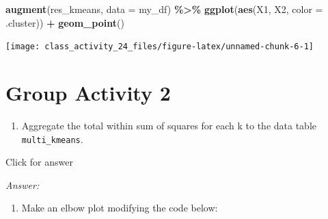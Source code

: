 \documentclass[
]{book}
\newenvironment{Shaded}{\begin{snugshade}}{\end{snugshade}}
\newcommand{\AttributeTok}[1]{\textcolor[rgb]{0.13,0.29,0.53}{#1}}
\newcommand{\DecValTok}[1]{\textcolor[rgb]{0.00,0.00,0.81}{#1}}
\newcommand{\FunctionTok}[1]{\textcolor[rgb]{0.13,0.29,0.53}{\textbf{#1}}}
\newcommand{\NormalTok}[1]{#1}
\newcommand{\OtherTok}[1]{\textcolor[rgb]{0.56,0.35,0.01}{#1}}
\newcommand{\SpecialCharTok}[1]{\textcolor[rgb]{0.81,0.36,0.00}{\textbf{#1}}}
\providecommand{\tightlist}{%
  \setlength{\itemsep}{0pt}\setlength{\parskip}{0pt}}
\begin{document}
\begin{Shaded}
\begin{Highlighting}[]
\FunctionTok{augment}\NormalTok{(res\_kmeans, }\AttributeTok{data =}\NormalTok{ my\_df) }\SpecialCharTok{\%\textgreater{}\%}
  \FunctionTok{ggplot}\NormalTok{(}\FunctionTok{aes}\NormalTok{(X1, X2, }\AttributeTok{color =}\NormalTok{ .cluster)) }\SpecialCharTok{+}
  \FunctionTok{geom\_point}\NormalTok{()}
\end{Highlighting}
\end{Shaded}

\texttt{[image: class\_activity\_24\_files/figure-latex/unnamed-chunk-6-1]}

\hypertarget{group-activity-2-8}{%
\section{Group Activity 2}\label{group-activity-2-8}}

\begin{enumerate}
\def\labelenumi{\alph{enumi}.}
\tightlist
\item
  Aggregate the total within sum of squares for each k to the data table \texttt{multi\_kmeans}.
\end{enumerate}

Click for answer

\emph{Answer:}

\begin{Shaded}
\end{Shaded}

\begin{enumerate}
\def\labelenumi{\alph{enumi}.}
\setcounter{enumi}{1}
\tightlist
\item
  Make an elbow plot modifying the code below:
\end{enumerate}
\end{document}
